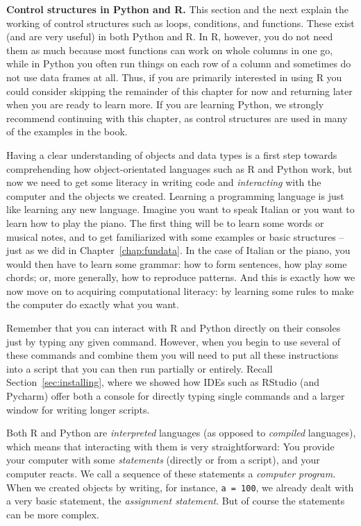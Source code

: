 \begin{feature}\textbf{Control structures in Python and R.}
  This section and the next explain the working of control structures
  such as loops, conditions, and functions.
  These exist (and are very useful) in both Python and R.
  In R, however, you do not need them as much because most functions
  can work on whole columns in one go, while in Python you often run things
  on each row of a column and sometimes do not use data frames at all.
  Thus, if you are primarily interested in using R you could consider skipping
  the remainder of this chapter for now and returning later when you are ready to learn more.
  If you are learning Python, we strongly recommend continuing with this chapter, as
  control structures are used in many of the examples in the book.
  \end{feature}
  


Having a clear understanding of objects and data types is a first step
towards comprehending how object-orientated languages such as R and Python work,
but now we need to get some literacy in writing code and \emph{interacting}
with the computer and the objects we created. Learning a programming
language is just like learning any new language.  Imagine you want to
speak Italian or you want to learn how to play the piano. The first thing
will be to learn some words or musical notes, and to get familiarized
with some examples or basic structures -- just as we did in Chapter~\ref{chap:fundata}. In the
case of Italian or the piano, you would then have to learn  some grammar:
how to form sentences, how play some chords; or, more generally,
how to reproduce patterns. And this is exactly how we 
now move on to acquiring computational literacy: by learning some
rules to make the computer do exactly what you want.

Remember that you can interact with R and Python directly on their
consoles just by typing any given command. However, when
you begin to use several of these commands and combine them
you will need to put all these instructions into a
script that you can then run partially or entirely. Recall Section~\ref{sec:installing},
where we showed how IDEs such as RStudio (and Pycharm) offer both a
console for directly typing single commands and a larger window
for writing longer scripts.

Both R and Python are \emph{interpreted} languages (as opposed to
\emph{compiled} languages), which means that interacting with
them is very straightforward: You provide your computer with some
\emph{statements} (directly or from a script), and your computer
reacts. We call a sequence of these statements a \emph{computer program}.
When we created objects by writing, for instance,
\verb|a = 100|,  we already dealt with a very basic statement, the \emph{assignment statement}. But of course the statements can be more complex.

